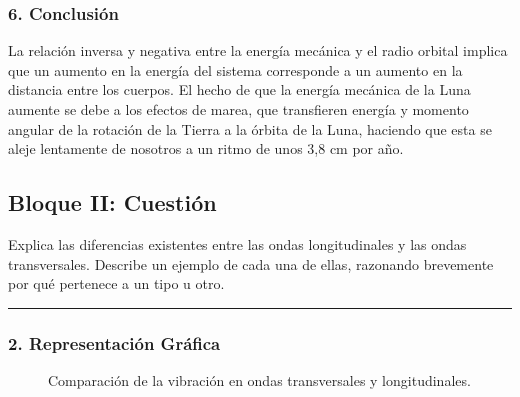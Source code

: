 \subsubsection*{6. Conclusión}
\begin{cajaconclusion}
La relación inversa y negativa entre la energía mecánica y el radio orbital implica que un aumento en la energía del sistema corresponde a un aumento en la distancia entre los cuerpos. El hecho de que la energía mecánica de la Luna aumente se debe a los efectos de marea, que transfieren energía y momento angular de la rotación de la Tierra a la órbita de la Luna, haciendo que esta se aleje lentamente de nosotros a un ritmo de unos 3,8 cm por año.
\end{cajaconclusion}

\newpage

\subsection{Bloque II: Cuestión}
\label{subsec:B2_2012_jun_ord}
\begin{cajaenunciado}
Explica las diferencias existentes entre las ondas longitudinales y las ondas transversales. Describe un ejemplo de cada una de ellas, razonando brevemente por qué pertenece a un tipo u otro.
\end{cajaenunciado}
\hrule

\subsubsection*{2. Representación Gráfica}
\begin{figure}[H]
    \centering
    \hfill
    \caption{Comparación de la vibración en ondas transversales y longitudinales.}
\end{figure}

